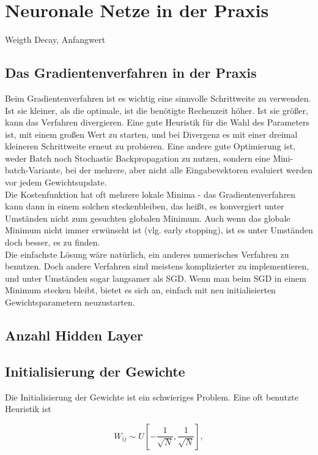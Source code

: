 \section{Neuronale Netze in der Praxis}
Weigth Decay, Anfangwert

\subsection{Das Gradientenverfahren in der Praxis}
Beim Gradientenverfahren ist es wichtig eine sinnvolle Schrittweite zu verwenden. Ist sie kleiner, als die optimale, ist die benötigte Rechenzeit höher. Ist sie größer, kann das Verfahren divergieren. Eine gute Heuristik für die Wahl des Parameters ist, mit einem großen Wert zu starten, und bei Divergenz es mit einer dreimal kleineren Schrittweite erneut zu probieren.
Eine andere gute Optimierung ist, weder Batch noch Stochastic Backpropagation zu nutzen, sondern eine Mini-batch-Variante, bei der mehrere, aber nicht alle Eingabevektoren evaluiert werden vor jedem Gewichtsupdate. \cite{bengio2012practical}\\
Die Kostenfunktion hat oft mehrere lokale Minima - das Gradientenverfahren kann dann in einem solchen steckenbleiben, das heißt, es konvergiert unter Umständen nicht zum gesuchten globalen Minimum. Auch wenn das globale Minimum nicht immer erwünscht ist (vlg. early stopping), ist es unter Umständen doch besser, es zu finden.\\
Die einfachste Lösung wäre natürlich, ein anderes numerisches Verfahren zu benutzen. Doch andere Verfahren sind meistens komplizierter zu implementieren, und unter Umständen sogar langsamer als SGD. Wenn man beim SGD in einem Minimum stecken bleibt, bietet es sich an, einfach mit neu initialisierten Gewichtsparametern neuzustarten.

\subsection{Anzahl Hidden Layer}

\subsection{Initialisierung der Gewichte}
Die Initialisierung der Gewichte ist ein schwieriges Problem. Eine oft benutzte Heuristik ist 

\begin{equation}
	W_{ij} \sim U [ -\frac{1}{\sqrt{N}} , \frac{1}{\sqrt{N}} ],
\end{equation}


